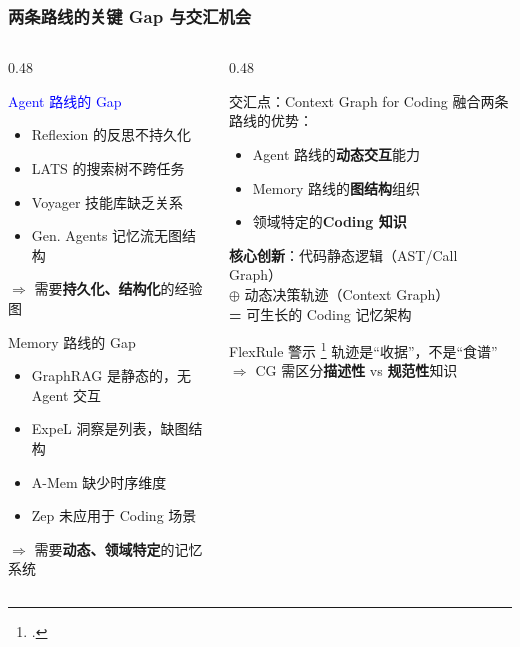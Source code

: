 \documentclass[aspectratio=169,10pt]{beamer}
\let\oldcite\cite
\renewcommand{\cite}[1]{\oldcite{#1}\footcitetext{#1}}
\begin{document}
\begin{frame}
  \frametitle{两条路线的关键 Gap 与交汇机会}

  \begin{columns}[T]
    \begin{column}{0.48\textwidth}
      \begin{block}{\textcolor{blue}{Agent 路线的 Gap}}
        \begin{itemize}
          \item Reflexion 的反思不持久化
          \item LATS 的搜索树不跨任务
          \item Voyager 技能库缺乏关系
          \item Gen. Agents 记忆流无图结构
        \end{itemize}
        \vspace{0.1cm}
        $\Rightarrow$ 需要\textbf{持久化、结构化}的经验图
      \end{block}

      \begin{block}{\textcolor{green!50!black}{Memory 路线的 Gap}}
        \begin{itemize}
          \item GraphRAG 是静态的，无 Agent 交互
          \item ExpeL 洞察是列表，缺图结构
          \item A-Mem 缺少时序维度
          \item Zep 未应用于 Coding 场景
        \end{itemize}
        \vspace{0.1cm}
        $\Rightarrow$ 需要\textbf{动态、领域特定}的记忆系统
      \end{block}
    \end{column}

    \begin{column}{0.48\textwidth}
      \begin{alertblock}{交汇点：Context Graph for Coding}
        融合两条路线的优势：
        \begin{itemize}
          \item Agent 路线的\textbf{动态交互}能力
          \item Memory 路线的\textbf{图结构}组织
          \item 领域特定的\textbf{Coding 知识}
        \end{itemize}
        \vspace{0.1cm}
        \textbf{核心创新}：代码静态逻辑（AST/Call Graph）\\
        $\oplus$ 动态决策轨迹（Context Graph）\\
        \textbf{=} 可生长的 Coding 记忆架构
      \end{alertblock}

      \begin{block}{FlexRule 警示 \cite{flexrule2024critique}}
        轨迹是``收据''，不是``食谱''\\
        $\Rightarrow$ CG 需区分\textbf{描述性} vs \textbf{规范性}知识
      \end{block}
    \end{column}
  \end{columns}
\end{frame}
\end{document}
